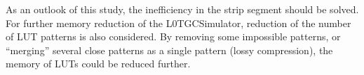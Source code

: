 As an outlook of this study, the inefficiency in the strip segment should be solved. For further memory reduction of the L0TGCSimulator, reduction of the number of LUT patterns is also considered. By removing some impossible patterns, or ``merging'' several close patterns as a single pattern (lossy compression), the memory of LUTs could be reduced further.
